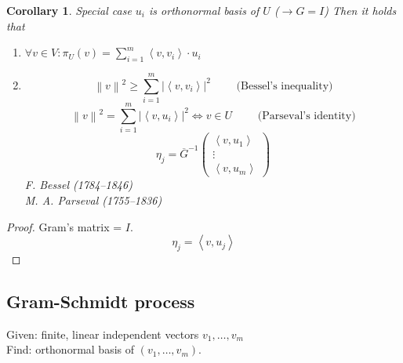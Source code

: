 \documentclass{article}
\newtheorem{corollary}{Corollary}  \numberwithin{corollary}{section}
\newcommand{\ip}[2]{\left\langle#1,#2\right\rangle} %
\newcommand{\norm}[1]{\left\|#1\right\|}
\newcommand{\card}[1]{\left|#1\right|}
\begin{document}
\begin{corollary} %
  \label{ONRcor}
  Special case $u_i$ is orthonormal basis of $U$ ($\rightarrow G = I$)
  Then it holds that
  \begin{enumerate}
    \item $\forall v \in V: \pi_U(v) = \sum_{i=1}^m \ip{v}{v_i} \cdot u_i$
    \item
      \[ \norm{v}^2 \geq \sum_{i=1}^m \card{\ip{v}{v_i}}^2 \qquad \text{ (Bessel's inequality)} \]
      \[ \norm{v}^2 = \sum_{i=1}^m \card{\ip{v}{u_i}}^2 \iff v \in U \qquad \text{ (Parseval's identity)} \]
      \[ \eta_j = \overline{G}^{-1}\begin{pmatrix} \ip{v}{u_1} \\ \vdots \\ \ip{v}{u_m} \end{pmatrix} \]
      F. Bessel (1784--1846) \\
      M. A. Parseval (1755--1836)
  \end{enumerate}
\end{corollary}

\begin{proof}
  Gram's matrix = $I$.
  \[ \eta_j = \ip{v}{u_j} \]
\end{proof}

\subsection{Gram-Schmidt process}

Given: finite, linear independent vectors $v_1, \dots, v_m$ \\
Find: orthonormal basis of $(v_1, \dots, v_m)$.
\end{document}
